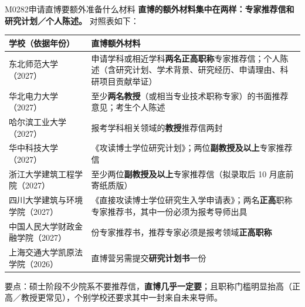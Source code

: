 \begin{qa}{M0282}{申请直博要额外准备什么材料}
\textbf{直博的额外材料集中在两样：专家推荐信和研究计划／个人陈述。} 对照表如下：

\par\vspace{2pt}\nobreak\begin{center}\footnotesize
\begin{tabularx}{\textwidth}{>{\raggedright\arraybackslash}X>{\raggedright\arraybackslash}X}
\toprule
\textbf{学校（依据年份）} & \textbf{直博额外材料} \\ \midrule
东北师范大学（2027） & 申请学科或相近学科\textbf{两名正高职称}专家推荐信；个人陈述（含研究计划、学术背景、研究经历、申请理由、科研项目贡献举证） \\
华北电力大学（2027） & 至少\textbf{两名教授}（或相当专业技术职称专家）的书面推荐意见；考生个人陈述 \\
哈尔滨工业大学（2027） & 报考学科相关领域的\textbf{教授}推荐信两封 \\
华中科技大学（2027） & 《攻读博士学位研究计划》；两位\textbf{副教授及以上}专家推荐信 \\
浙江大学建筑工程学院（2027） & 至少两位\textbf{副教授及以上}专家推荐信（拟录取后 10 月底前寄纸质版） \\
四川大学建筑与环境学院（2027） & 《直接攻读博士学位研究生入学申请表》；两名\textbf{正高}职称专家推荐书，其中一份必须为报考导师出具 \\
中国人民大学财政金融学院（2027） & 2 份专家推荐书，推荐专家必须是报考领域\textbf{正高职称} \\
上海交通大学凯原法学院（2026） & 直博营另需提交\textbf{研究计划书}一份 \\
\bottomrule
\end{tabularx}
\end{center}\vspace{2pt}\par

要点：硕士阶段不少院系不要推荐信，\textbf{直博几乎一定要}；且职称门槛明显抬高（正高／教授更常见），个别学校还要求其中一封来自未来导师。
\end{qa}

